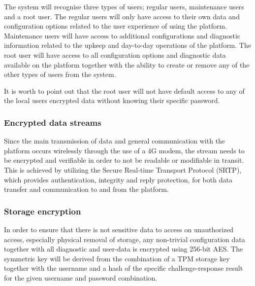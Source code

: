\documentclass[10pt]{article}
\begin{document}
        The system will recognise three types of users; regular users,
        maintenance users and a root user. The regular users will only have
        access to their own data and configuration options related to the user
        experience of using the platform. Maintenance users will have access to
        additional configurations and diagnostic information related to the
        upkeep and day-to-day operations of the platform. The root user will
        have access to all configuration options and diagnostic data  available
        on the platform together with the ability to create or remove any of
        the other types of users from the system.

        It is worth to point out that the root user will not have default
        access to any of the local users encrypted data without knowing their
        specific password.

      \subsubsection{Encrypted data streams}

        Since the main transmission of data and general communication with the
        platform occurs wirelessly through the use of a 4G modem, the stream
        needs to be encrypted and verifiable in order to not be readable or
        modifiable in transit. This is achieved by utilizing the Secure
        Real-time Transport Protocol (SRTP), which provides authentication,
        integrity and reply protection, for both data transfer and
        communication to and from the platform.

      \subsubsection{Storage encryption}

        In order to ensure that there is not sensitive data to access on
        unauthorized access, especially physical removal of storage, any
        non-trivial configuration data together with all diagnostic and
        user-data is encrypted using 256-bit AES. The symmetric key will be
        derived from the combination of a TPM storage key together with the
        username and a hash of the specific challenge-response result for the
        given username and password combination.
\end{document}
